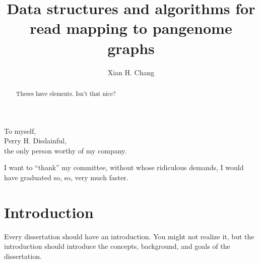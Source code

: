 \documentclass[11pt]{ucscthesis}
\begin{document}

\title{Data structures and algorithms for read mapping to pangenome graphs}
\author{Xian H. Chang}
\deanlinethree{}

\begin{frontmatter}

\maketitle
\copyrightpage

\tableofcontents
\listoffigures
\listoftables
\listofalgorithms

\begin{abstract}
Theses have elements.  Isn't that nice?

\end{abstract}

\begin{dedication}
\null\vfil
{\large
\begin{center}
To myself,\\\vspace{12pt}
Perry H. Disdainful,\\\vspace{12pt}
the only person worthy of my company.
\end{center}}
\vfil\null
\end{dedication}


\begin{acknowledgements}
I want to ``thank'' my committee, without whose ridiculous demands, I
would have graduated so, so, very much faster.
\end{acknowledgements}

\end{frontmatter}


\chapter{Introduction}

Every dissertation should have an introduction.  You might not realize
it, but the introduction should introduce the concepts, background,
and goals of the dissertation.
\end{document}
